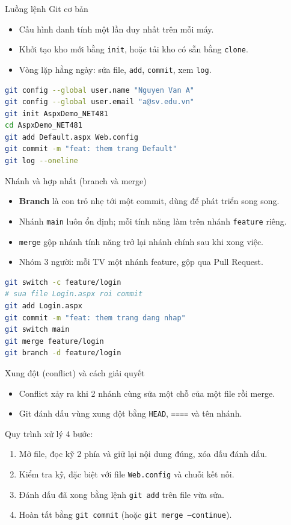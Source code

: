 \begin{frame}[fragile]{Luồng lệnh Git cơ bản}
\begin{itemize}
  \item Cấu hình danh tính một lần duy nhất trên mỗi máy.
  \item Khởi tạo kho mới bằng \texttt{init}, hoặc tải kho có sẵn bằng \texttt{clone}.
  \item Vòng lặp hằng ngày: sửa file, \texttt{add}, \texttt{commit}, xem \texttt{log}.
\end{itemize}
\begin{lstlisting}[language=bash]
git config --global user.name "Nguyen Van A"
git config --global user.email "a@sv.edu.vn"
git init AspxDemo_NET481
cd AspxDemo_NET481
git add Default.aspx Web.config
git commit -m "feat: them trang Default"
git log --oneline
\end{lstlisting}
\end{frame}

\begin{frame}[fragile]{Nhánh và hợp nhất (branch và merge)}
\begin{itemize}
  \item \textbf{Branch} là con trỏ nhẹ tới một commit, dùng để phát triển song song.
  \item Nhánh \texttt{main} luôn ổn định; mỗi tính năng làm trên nhánh \texttt{feature} riêng.
  \item \texttt{merge} gộp nhánh tính năng trở lại nhánh chính sau khi xong việc.
  \item Nhóm 3 người: mỗi TV một nhánh feature, gộp qua Pull Request.
\end{itemize}
\begin{lstlisting}[language=bash]
git switch -c feature/login
# sua file Login.aspx roi commit
git add Login.aspx
git commit -m "feat: them trang dang nhap"
git switch main
git merge feature/login
git branch -d feature/login
\end{lstlisting}
\end{frame}

\begin{frame}{Xung đột (conflict) và cách giải quyết}
\begin{itemize}
  \item Conflict xảy ra khi 2 nhánh cùng sửa một chỗ của một file rồi merge.
  \item Git đánh dấu vùng xung đột bằng \texttt{HEAD}, \texttt{====} và tên nhánh.
\end{itemize}
Quy trình xử lý 4 bước:
\begin{enumerate}
  \item Mở file, đọc kỹ 2 phía và giữ lại nội dung đúng, xóa dấu đánh dấu.
  \item Kiểm tra kỹ, đặc biệt với file \texttt{Web.config} và chuỗi kết nối.
  \item Đánh dấu đã xong bằng lệnh \texttt{git add} trên file vừa sửa.
  \item Hoàn tất bằng \texttt{git commit} (hoặc \texttt{git merge --continue}).
\end{enumerate}
\end{frame}


